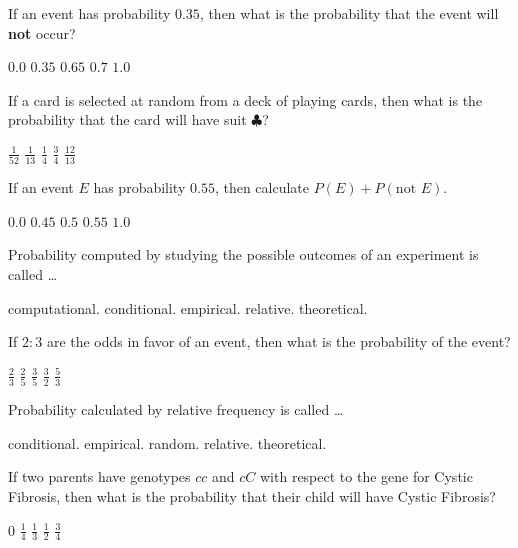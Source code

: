 \documentclass[answers,12pt]{exam}
\begin{document}
\begin{questions}
\question If an event has probability $0.35$,
then what is the probability that the event will {\bf not} occur?\\
\begin{oneparchoices}
\choice $0.0$
\choice $0.35$
\correctchoice $0.65$
\choice $0.7$
\choice $1.0$
\end{oneparchoices}

\question If a card is selected at random from a deck of
playing cards, then what is the probability that
the card will have suit $\clubsuit$?\\
\begin{oneparchoices}
\choice $\frac{1}{52}$
\choice $\frac{1}{13}$
\correctchoice $\frac{1}{4}$
\choice $\frac{3}{4}$
\choice $\frac{12}{13}$
\end{oneparchoices}

\question If an event $E$ has probability $0.55$,
then calculate $P\left(E\right)+P\left(\text{not $E$}\right)$.\\
\begin{oneparchoices}
\choice $0.0$
\choice $0.45$
\choice $0.5$
\choice $0.55$
\correctchoice $1.0$
\end{oneparchoices}

\question Probability computed by studying
the possible outcomes of an experiment is called \dots\\
\begin{oneparchoices}
\choice computational.
\choice conditional.
\choice empirical.
\choice relative.
\correctchoice theoretical.
\end{oneparchoices}

\question If $2:3$ are the odds in favor
of an event, then what is the probability of the event?\\
\begin{oneparchoices}
\choice $\frac{2}{3}$ %
\correctchoice $\frac{2}{5}$
\choice $\frac{3}{5}$ %
\choice $\frac{3}{2}$ %
\choice $\frac{5}{3}$ %
\end{oneparchoices}

\question Probability calculated by relative frequency is called \dots\\
\begin{oneparchoices}
\choice conditional.
\correctchoice empirical.
\choice random.
\choice relative.
\choice theoretical.
\end{oneparchoices}

\question If two parents have genotypes $cc$ and $cC$
with respect to the gene for Cystic Fibrosis, then what
is the probability that their child will have
Cystic Fibrosis?\\
\begin{oneparchoices}
\choice $0$
\choice $\frac{1}{4}$
\choice $\frac{1}{3}$
\correctchoice $\frac{1}{2}$
\choice $\frac{3}{4}$
\end{oneparchoices}

\end{questions}
\end{document}
